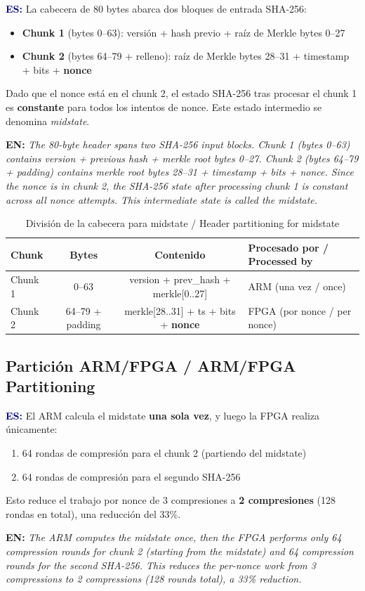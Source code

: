 \documentclass[12pt,a4paper]{article}
\newcommand{\es}[1]{\foreignlanguage{spanish}{#1}}
\newcommand{\en}[1]{\foreignlanguage{english}{#1}}
\newcommand{\bsubsection}[2]{%
    \subsection{#1 \textnormal{\small\color{accentblue}/ #2}}%
}
\newenvironment{bilingual}{%
    \par\medskip
}{%
    \par\medskip
}
\newcommand{\espara}[1]{\noindent\textcolor{darkblue}{\textbf{ES:}} #1\par\smallskip}
\newcommand{\enpara}[1]{\noindent\textcolor{accentblue}{\textbf{EN:}} \textit{#1}\par\smallskip}
\begin{document}
\begin{bilingual}
\espara{%
La cabecera de 80 bytes abarca dos bloques de entrada SHA-256:
\begin{itemize}[leftmargin=2em]
    \item \textbf{Chunk 1} (bytes 0--63): versi\'on + hash previo + ra\'iz de Merkle bytes 0--27
    \item \textbf{Chunk 2} (bytes 64--79 + relleno): ra\'iz de Merkle bytes 28--31 + timestamp + bits + \textbf{nonce}
\end{itemize}
Dado que el nonce est\'a en el chunk 2, el estado SHA-256 tras procesar el chunk 1
es \textbf{constante} para todos los intentos de nonce. Este estado intermedio se
denomina \textit{midstate}.}

\enpara{%
The 80-byte header spans two SHA-256 input blocks. Chunk 1 (bytes 0--63) contains
version + previous hash + merkle root bytes 0--27. Chunk 2 (bytes 64--79 + padding)
contains merkle root bytes 28--31 + timestamp + bits + nonce. Since the nonce is in
chunk 2, the SHA-256 state after processing chunk 1 is constant across all nonce
attempts. This intermediate state is called the midstate.}
\end{bilingual}

\begin{table}[h]
    \centering
    \caption{\es{Divisi\'on de la cabecera para midstate} /
             \en{Header partitioning for midstate}}
    \begin{tabular}{@{}lccl@{}}
        \toprule
        \textbf{Chunk} & \textbf{Bytes} & \textbf{\es{Contenido}} & \textbf{\es{Procesado por} / \en{Processed by}} \\
        \midrule
        Chunk 1 & 0--63 & version + prev\_hash + merkle[0..27] & ARM (una vez / once) \\
        Chunk 2 & 64--79 + padding & merkle[28..31] + ts + bits + \textbf{nonce} & FPGA (por nonce / per nonce) \\
        \bottomrule
    \end{tabular}
\end{table}

\bsubsection{Partici\'on ARM/FPGA}{ARM/FPGA Partitioning}

\begin{bilingual}
\espara{%
El ARM calcula el midstate \textbf{una sola vez}, y luego la FPGA realiza \'unicamente:
\begin{enumerate}[leftmargin=2em]
    \item 64 rondas de compresi\'on para el chunk 2 (partiendo del midstate)
    \item 64 rondas de compresi\'on para el segundo SHA-256
\end{enumerate}
Esto reduce el trabajo por nonce de 3 compresiones a \textbf{2 compresiones}
(128 rondas en total), una reducci\'on del 33\%.}

\enpara{%
The ARM computes the midstate once, then the FPGA performs only 64 compression
rounds for chunk 2 (starting from the midstate) and 64 compression rounds for
the second SHA-256. This reduces the per-nonce work from 3 compressions to
2 compressions (128 rounds total), a 33\% reduction.}
\end{bilingual}
\end{document}
